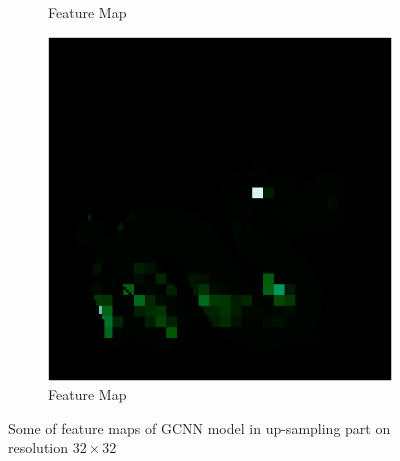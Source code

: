 \begin{figure}[H]
\begin{subfigure}[b]{0.19\linewidth}
		\caption{Feature Map}
	\end{subfigure}
	\begin{subfigure}[b]{0.19\linewidth}
		\includegraphics[width=\linewidth]{./Figures/feature_map_gcnn/feature_map_gcnn-gcnn_127.png}
		\caption{Feature Map}
	\end{subfigure}
	
	\decoRule
	\caption{Some of feature maps of GCNN model in up-sampling part on resolution $ 32\times32 $}
	\label{fig:detail-feature-maps}
\end{figure}

